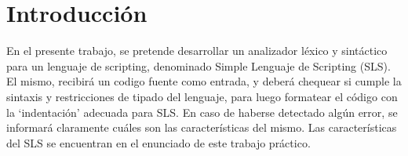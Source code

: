 \section{Introducción}

En el presente trabajo, se pretende desarrollar un analizador léxico y sintáctico para un lenguaje de scripting, denominado Simple Lenguaje de Scripting (SLS). El mismo, recibirá un codigo fuente como entrada, y deberá chequear si cumple la sintaxis y restricciones de tipado del lenguaje, para luego formatear el código con la ‘indentación’ adecuada para SLS. En caso de haberse detectado algún error, se informará claramente cuáles son las características del mismo.
Las características del SLS se encuentran en el enunciado de este trabajo práctico.
